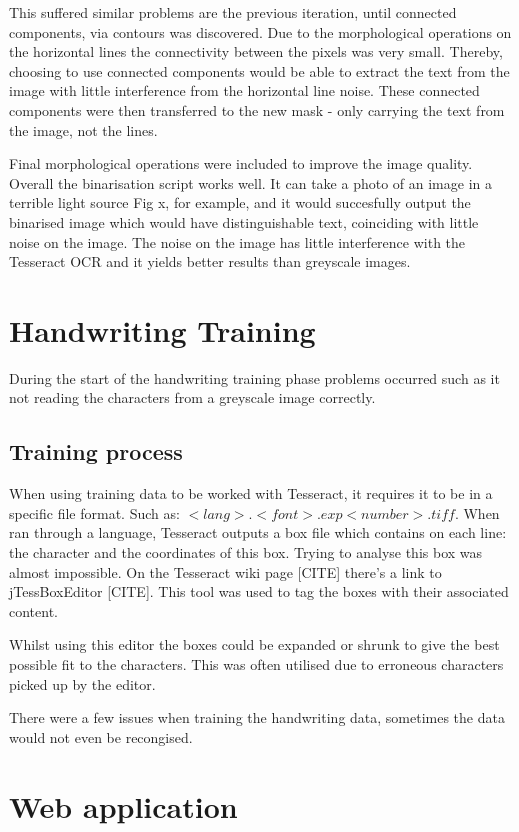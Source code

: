 This suffered similar problems are the previous iteration, until connected components, via contours was discovered. Due to the morphological operations on the horizontal lines the connectivity between the pixels was very small. Thereby, choosing to use connected components would be able to extract the text from the image with little interference from the horizontal line noise. These connected components were then transferred to the new mask - only carrying the text from the image, not the lines.

Final morphological operations were included to improve the image quality. Overall the binarisation script works well.  It can take a photo of an image in a terrible light source Fig x, for example, and it would succesfully output the binarised image which would have distinguishable text, coinciding with little noise on the image. The noise on the image has little interference with the Tesseract OCR and it yields better results than greyscale images.

\section{Handwriting Training}
During the start of the handwriting training phase problems occurred such as it not reading the characters from a greyscale image correctly.
\subsection{Training process}
When using training data to be worked with Tesseract, it requires it to be in a specific file format. Such as: $<lang>.<font>.exp<number>.tiff$. When ran through a language, Tesseract outputs a box file which contains on each line: the character and the coordinates of this box. Trying to analyse this box was almost impossible. On the Tesseract wiki page [CITE] there's a link to jTessBoxEditor [CITE]. This tool was used to tag the boxes with their associated content.

Whilst using this editor the boxes could be expanded or shrunk to give the best possible fit to the characters. This was often utilised due to erroneous characters picked up by the editor.

There were a few issues when training the handwriting data, sometimes the data would not even be recongised.




\section{Web application}

